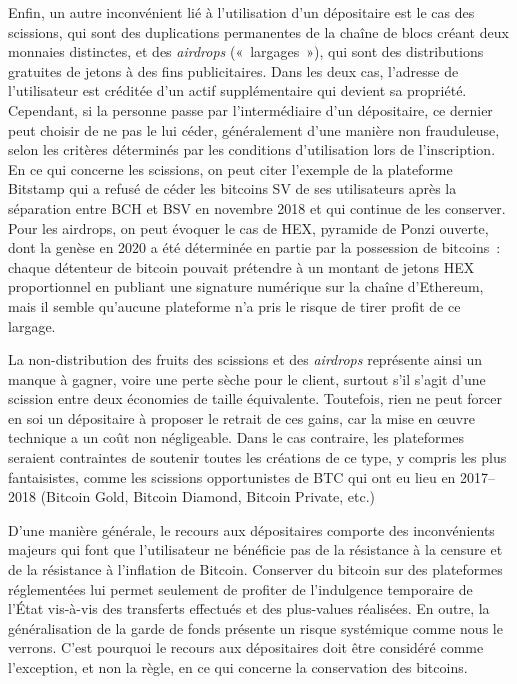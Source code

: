 Enfin, un autre inconvénient lié à l'utilisation d'un dépositaire est le cas des scissions, qui sont des duplications permanentes de la chaîne de blocs créant deux monnaies distinctes, et des \emph{airdrops} («~largages~»), qui sont des distributions gratuites de jetons à des fins publicitaires. Dans les deux cas, l'adresse de l'utilisateur est créditée d'un actif supplémentaire qui devient sa propriété. Cependant, si la personne passe par l'intermédiaire d'un dépositaire, ce dernier peut choisir de ne pas le lui céder, généralement d'une manière non frauduleuse, selon les critères déterminés par les conditions d'utilisation lors de l'inscription. En ce qui concerne les scissions, on peut citer l'exemple de la plateforme Bitstamp qui a refusé de céder les bitcoins SV de ses utilisateurs après la séparation entre BCH et BSV en novembre 2018 et qui continue de les conserver. Pour les airdrops, on peut évoquer le cas de HEX, pyramide de Ponzi ouverte, dont la genèse en 2020 a été déterminée en partie par la possession de bitcoins~: chaque détenteur de bitcoin pouvait prétendre à un montant de jetons HEX proportionnel en publiant une signature numérique sur la chaîne d'Ethereum, mais il semble qu'aucune plateforme n'a pris le risque de tirer profit de ce largage.

La non-distribution des fruits des scissions et des \emph{airdrops} représente ainsi un manque à gagner, voire une perte sèche pour le client, surtout s'il s'agit d'une scission entre deux économies de taille équivalente. Toutefois, rien ne peut forcer en soi un dépositaire à proposer le retrait de ces gains, car la mise en œuvre technique a un coût non négligeable. Dans le cas contraire, les plateformes seraient contraintes de soutenir toutes les créations de ce type, y compris les plus fantaisistes, comme les scissions opportunistes de BTC qui ont eu lieu en 2017--2018 (Bitcoin Gold, Bitcoin Diamond, Bitcoin Private, etc.) %

D'une manière générale, le recours aux dépositaires comporte des inconvénients majeurs qui font que l'utilisateur ne bénéficie pas de la résistance à la censure et de la résistance à l'inflation de Bitcoin. Conserver du bitcoin sur des plateformes réglementées lui permet seulement de profiter de l'indulgence temporaire de l'État vis-à-vis des transferts effectués et des plus-values réalisées. En outre, la généralisation de la garde de fonds présente un risque systémique comme nous le verrons. C'est pourquoi le recours aux dépositaires doit être considéré comme l'exception, et non la règle, en ce qui concerne la conservation des bitcoins.

